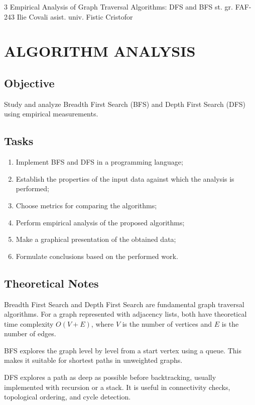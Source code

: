 \documentclass{labreport}
\begin{document}
\labtitle
    {3}
    {Empirical Analysis of Graph Traversal Algorithms: DFS and BFS}
    {st. gr. FAF-243}
    {Ilie Covali}
    {asist. univ. Fistic Cristofor}

\tableofcontents
\newpage

\section{ALGORITHM ANALYSIS}

\subsection{Objective}
Study and analyze Breadth First Search (BFS) and Depth First Search (DFS) using empirical measurements.

\subsection{Tasks}
\begin{enumerate}
    \item Implement BFS and DFS in a programming language;
    \item Establish the properties of the input data against which the analysis is performed;
    \item Choose metrics for comparing the algorithms;
    \item Perform empirical analysis of the proposed algorithms;
    \item Make a graphical presentation of the obtained data;
    \item Formulate conclusions based on the performed work.
\end{enumerate}

\subsection{Theoretical Notes}
Breadth First Search and Depth First Search are fundamental graph traversal algorithms. For a graph represented with adjacency lists, both have theoretical time complexity $O(V + E)$, where $V$ is the number of vertices and $E$ is the number of edges.

BFS explores the graph level by level from a start vertex using a queue. This makes it suitable for shortest paths in unweighted graphs.

DFS explores a path as deep as possible before backtracking, usually implemented with recursion or a stack. It is useful in connectivity checks, topological ordering, and cycle detection.
\end{document}
